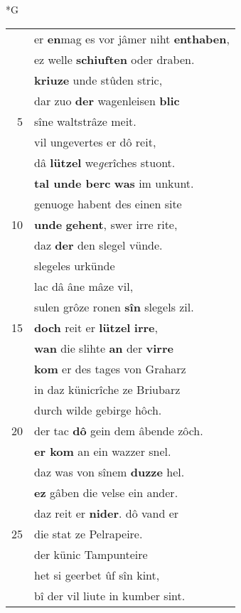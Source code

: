 \documentclass[8pt,a4paper,notitlepage]{article}
\begin{document}
\newpage
\begin{table}[ht]
\begin{minipage}[t]{0.5\linewidth}
\small
\begin{center}*G
\end{center}
\begin{tabular}{rl}
 & er \textbf{en}mag es vor jâmer niht \textbf{enthaben},\\ 
 & ez welle \textbf{schiuften} oder draben.\\ 
 & \textbf{kriuze} unde stûden stric,\\ 
 & dar zuo \textbf{der} wagenleisen \textbf{blic}\\ 
5 & sîne waltstrâze meit.\\ 
 & vil ungevertes er dô reit,\\ 
 & dâ \textbf{lützel} we\textit{ge}rîches stuont.\\ 
 & \textbf{tal unde berc} \textbf{was} im unkunt.\\ 
 & genuoge habent des einen site\\ 
10 & \textbf{unde} \textbf{gehent}, swer irre rite,\\ 
 & daz \textbf{der} den slegel vünde.\\ 
 & slegeles urkünde\\ 
 & lac dâ âne mâze vil,\\ 
 & sulen grôze ronen \textbf{sîn} slegels zil.\\ 
15 & \textbf{doch} reit er \textbf{lützel} \textbf{irre},\\ 
 & \textbf{wan} die slihte \textbf{an} der \textbf{virre}\\ 
 & \textbf{kom} er des tages von Graharz\\ 
 & in daz künicrîche ze Briubarz\\ 
 & durch wilde gebirge hôch.\\ 
20 & der tac \textbf{dô} gein dem âbende zôch.\\ 
 & \textbf{er kom} an ein wazzer snel.\\ 
 & daz was von sînem \textbf{duzze} hel.\\ 
 & \textbf{ez} gâben die velse ein ander.\\ 
 & daz reit er \textbf{nider}. dô vand er\\ 
25 & die stat ze Pelrapeire.\\ 
 & der künic Tampunteire\\ 
 & het si geerbet ûf sîn kint,\\ 
 & bî der vil liute in kumber sint.\\ 

\end{tabular}
\end{minipage}
\end{table}
\end{document}
